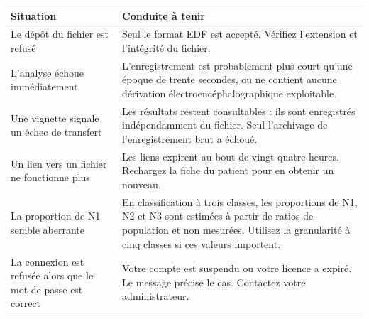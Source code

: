 \begin{table}[H]
\centering
\small
\begin{tabular}{@{}L{5.3cm}L{8.8cm}@{}}
\toprule
\textbf{Situation} & \textbf{Conduite à tenir} \\
\midrule
Le dépôt du fichier est refusé &
Seul le format EDF est accepté. Vérifiez l'extension et l'intégrité du fichier. \\
\addlinespace[3pt]
L'analyse échoue immédiatement &
L'enregistrement est probablement plus court qu'une époque de trente secondes, ou ne
contient aucune dérivation électroencéphalographique exploitable. \\
\addlinespace[3pt]
Une vignette signale un échec de transfert &
Les résultats restent consultables : ils sont enregistrés indépendamment du fichier.
Seul l'archivage de l'enregistrement brut a échoué. \\
\addlinespace[3pt]
Un lien vers un fichier ne fonctionne plus &
Les liens expirent au bout de vingt-quatre heures. Rechargez la fiche du patient pour
en obtenir un nouveau. \\
\addlinespace[3pt]
La proportion de N1 semble aberrante &
En classification à trois classes, les proportions de N1, N2 et N3 sont estimées à
partir de ratios de population et non mesurées. Utilisez la granularité à cinq classes
si ces valeurs importent. \\
\addlinespace[3pt]
La connexion est refusée alors que le mot de passe est correct &
Votre compte est suspendu ou votre licence a expiré. Le message précise le cas.
Contactez votre administrateur. \\
\bottomrule
\end{tabular}
\end{table}
